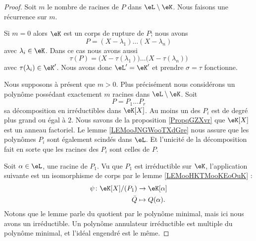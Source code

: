 \begin{proof}
    Soit \( m\) le nombre de racines de \( P\) dans \( \eL\setminus \eK\). Nous faisons une récurrence sur \( m\).

    Si \( m=0\) alors \( \eK\) est un corps de rupture de \( P\); nous avons
    \begin{equation}
        P=(X-\lambda_1)\ldots (X-\lambda_n)
    \end{equation}
    avec \( \lambda_i\in \eK\). Dans ce cas nous avons aussi
    \begin{equation}
        \tau(P)=\big( X-\tau(\lambda_1) \big)\ldots \big( X-\tau(\lambda_n) \big)
    \end{equation}
    avec \( \tau(\lambda_i)\in \eK'\). Nous avons donc \( \eL'=\eK'\) et prendre \( \sigma=\tau\) fonctionne.

    Nous supposons à présent que \( m>0\). Plus précisément nous considérons un polynôme possédant exactement \( m\) racines dans \( \eL\setminus \eK\). Soit
    \begin{equation}
        P=P_1\ldots P_r
    \end{equation}
    sa décomposition en irréductibles dans \( \eK[X]\). Au moins un des \( P_i\) est de degré plus grand ou égal à \( 2\). Nous savons de la proposition \ref{PropqGZXvr} que \( \eK[X]\) est un anneau factoriel. Le lemme \ref{LEMooJNGWooTXdGre} nous assure que les polynômes \( P_i\) sont également scindés dans \( \eL\). Et l'unicité de la décomposition fait en sorte que les racines des \( P_i\) sont celles de \( P\).

    Soit \( \alpha\in \eL\), une racine de \( P_1\). Vu que \( P_1\) est irréductible sur \( \eK\), l'application suivante est un isomorphisme de corps par le lemme \ref{LEMooHKTMooKEoOuK} :
    \begin{equation}
        \begin{aligned}
            \psi\colon \eK[X]/(P_1)&\to \eK[\alpha] \\
            \bar Q&\mapsto Q(\alpha). 
        \end{aligned}
    \end{equation}
    Notons que le lemme parle du quotient par le polynôme minimal, mais ici nous avons un irréductible. Un polynôme annulateur irréductible est multiple du polynôme minimal, et l'idéal engendré est le même. 


\end{proof}
